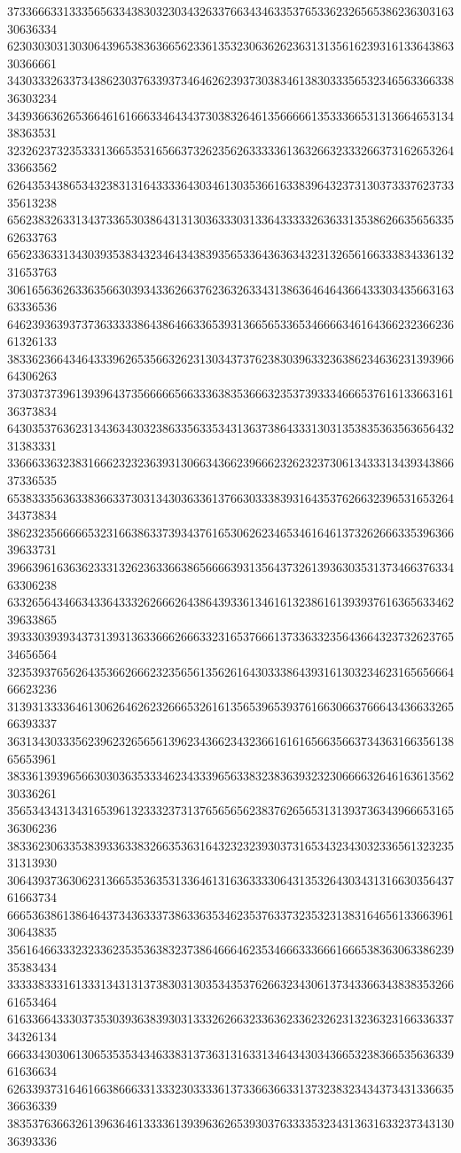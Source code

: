 37336663313335656334383032303432633766343463353765336232656538623630316330636334
62303030313030643965383636656233613532306362623631313561623931613364386330366661
34303332633734386230376339373464626239373038346138303335653234656336633836303234
34393663626536646161666334643437303832646135666661353336653131366465313438363531
32326237323533313665353165663732623562633333613632663233326637316265326433663562
62643534386534323831316433336430346130353661633839643237313037333762373335613238
65623832633134373365303864313130363330313364333332636331353862663565633562633763
65623363313430393538343234643438393565336436363432313265616633383433613231653763
30616563626336356630393433626637623632633431386364646436643330343566316363336536
64623936393737363333386438646633653931366565336534666634616436623236623661326133
38336236643464333962653566326231303437376238303963323638623463623139396664306263
37303737396139396437356666656633363835366632353739333466653761613366316136373834
64303537636231343634303238633563353431363738643331303135383536356365643231383331
33666336323831666232323639313066343662396662326232373061343331343934386637336535
65383335636338366337303134303633613766303338393164353762663239653165326434373834
38623235666665323166386337393437616530626234653461646137326266633539636639633731
39663961636362333132623633663865666639313564373261393630353137346637633463306238
63326564346634336433326266626438643933613461613238616139393761636563346239633865
39333039393437313931363366626663323165376661373363323564366432373262376534656564
32353937656264353662666232356561356261643033386439316130323462316565666466623236
31393133336461306264626232666532616135653965393761663066376664343663326566393337
36313430333562396232656561396234366234323661616165663566373436316635613865653961
38336139396566303036353334623433396563383238363932323066663264616361356230336261
35653434313431653961323332373137656565623837626565313139373634396665316536306236
38336230633538393363383266353631643232323930373165343234303233656132323531313930
30643937363062313665353635313364613163633330643135326430343131663035643761663734
66653638613864643734363337386336353462353763373235323138316465613366396130643835
35616466333232336235353638323738646664623534666333666166653836306338623935383434
33333833316133313431313738303130353435376266323430613734336634383835326661653464
61633664333037353039363839303133326266323363623362326231323632316633633734326134
66633430306130653535343463383137363131633134643430343665323836653563633961636634
62633937316461663866633133323033336137336636633137323832343437343133663536636339
38353763663261396364613333613939636265393037633335323431363163323734313036393336
